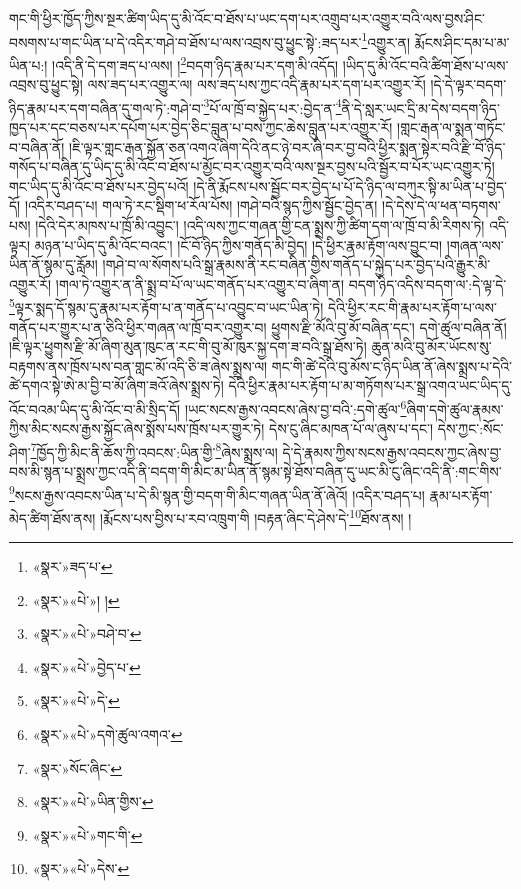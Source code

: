 གང་གི་ཕྱིར་ཁྱོད་ཀྱིས་སྔར་ཚིག་ཡིད་དུ་མི་འོང་བ་ཐོས་པ་ཡང་དག་པར་འགྲུབ་པར་འགྱུར་བའི་ལས་བྱས་ཤིང་བསགས་པ་གང་ཡིན་པ་དེ་འདིར་གཤེ་བ་ཐོས་པ་ལས་འབྲས་བུ་ཕྱུང་སྟེ་:ཟད་པར་\footnote{«སྣར་»ཟད་པ་}འགྱུར་ན། རྨོངས་ཤིང་དམ་པ་མ་ཡིན་པ:། །འདི་ནི་དེ་དག་ཟད་པ་ལས། །\footnote{«སྣར་»«པེ་»། །}བདག་ཉིད་རྣམ་པར་དག་མི་འདོད། །ཡིད་དུ་མི་འོང་བའི་ཚིག་ཐོས་པ་ལས་འབྲས་བུ་ཕྱུང་སྟེ། ལས་ཟད་པར་འགྱུར་ལ། ལས་ཟད་པས་ཀྱང་འདི་རྣམ་པར་དག་པར་འགྱུར་རོ། །དེ་དེ་ལྟར་བདག་ཉིད་རྣམ་པར་དག་བཞིན་དུ་གལ་ཏེ་:གཤེ་བ་\footnote{«སྣར་»«པེ་»བཤེ་བ་}པོ་ལ་ཁྲོ་བ་སྐྱེད་པར་:བྱེད་ན་\footnote{«སྣར་»«པེ་»བྱེད་པ་}ནི་དེ་སླར་ཡང་དྲི་མ་དེས་བདག་ཉིད་ཁྱད་པར་དང་བཅས་པར་དཔོག་པར་བྱེད་ཅིང་བླུན་པ་བས་ཀྱང་ཆེས་བླུན་པར་འགྱུར་རོ། །གླང་རྒན་ལ་སྨན་གཏོང་བ་བཞིན་ནོ། །ཇི་ལྟར་གླང་རྒན་སྐྱོན་ཅན་འགའ་ཞིག་དེའི་ནང་ཉེ་བར་ཞི་བར་བྱ་བའི་ཕྱིར་སྨན་སྟེར་བའི་རྫི་བོ་ཉིད་གསོད་པ་བཞིན་དུ་ཡིད་དུ་མི་འོང་བ་ཐོས་པ་མྱོང་བར་འགྱུར་བའི་ལས་སྔར་བྱས་པའི་སྦྱོར་བ་པོར་ཡང་འགྱུར་ཏེ། གང་ཡིད་དུ་མི་འོང་བ་ཐོས་པར་བྱེད་པའོ། །དེ་ནི་རྨོངས་པས་སྦྱོང་བར་བྱེད་པ་པོ་དེ་ཉིད་ལ་བཀུར་སྟི་མ་ཡིན་པ་བྱེད་དོ། །འདིར་བཤད་པ། གལ་ཏེ་རང་སྡིག་ཕ་རོལ་པོས། །གཤེ་བའི་སྙད་ཀྱིས་སྦྱོང་བྱེད་ན། །དེ་དེས་དེ་ལ་ཕན་བཏགས་པས། །དེའི་དེར་མཁས་པ་ཁྲོ་མི་འབྱུང་། །འདི་ལས་ཀྱང་གཞན་གྱི་ངན་སྨྲས་ཀྱི་ཚིག་དག་ལ་ཁྲོ་བ་མི་རིགས་ཏེ། འདི་ལྟར། མཉན་པ་ཡིད་དུ་མི་འོང་བའང་། །ངོ་བོ་ཉིད་ཀྱིས་གནོད་མི་བྱེད། །དེ་ཕྱིར་རྣམ་རྟོག་ལས་བྱུང་བ། །གཞན་ལས་ཡིན་ནོ་སྙམ་དུ་རློམ། །གཤེ་བ་ལ་སོགས་པའི་སྒྲ་རྣམས་ནི་རང་བཞིན་གྱིས་གནོད་པ་སྐྱེད་པར་བྱེད་པའི་རྒྱུར་མི་འགྱུར་རོ། །གལ་ཏེ་འགྱུར་ན་ནི་སྨྲ་བ་པོ་ལ་ཡང་གནོད་པར་འགྱུར་བ་ཞིག་ན། བདག་ཉིད་འདིས་བདག་ལ་:དེ་ལྟ་དེ་\footnote{«སྣར་»«པེ་»དེ་}ལྟར་སྨད་དོ་སྙམ་དུ་རྣམ་པར་རྟོག་པ་ན་གནོད་པ་འབྱུང་བ་ཡང་ཡིན་ཏེ། དེའི་ཕྱིར་རང་གི་རྣམ་པར་རྟོག་པ་ལས་གནོད་པར་གྱུར་པ་ན་ཅིའི་ཕྱིར་གཞན་ལ་ཁྲོ་བར་འགྱུར་བ། ཕྱུགས་རྫི་མོའི་བུ་མོ་བཞིན་དང་། དགེ་ཚུལ་བཞིན་ནོ། །ཇི་ལྟར་ཕྱུགས་རྫི་མོ་ཞིག་མུན་ཁུང་ན་རང་གི་བུ་མོ་ཁུར་སྐྱ་དག་ཟ་བའི་སྒྲ་ཐོས་ཏེ། ཆུན་མའི་བུ་མོར་ཡོངས་སུ་བརྟགས་ནས་ཁྲོས་པས་བན་གླང་མོ་འདི་ཅི་ཟ་ཞེས་སྨྲས་ལ། གང་གི་ཚེ་དེའི་བུ་མོས་ང་ཉིད་ཡིན་ནོ་ཞེས་སྨྲས་པ་དེའི་ཚེ་དགའ་སྟེ་ཨེ་མ་བྱི་བ་མོ་ཞིག་ཟའོ་ཞེས་སྨྲས་ཏེ། དེའི་ཕྱིར་རྣམ་པར་རྟོག་པ་མ་གཏོགས་པར་སྒྲ་འགའ་ཡང་ཡིད་དུ་འོང་བའམ་ཡིད་དུ་མི་འོང་བ་མི་སྲིད་དོ། །ཡང་སངས་རྒྱས་འབངས་ཞེས་བྱ་བའི་:དགེ་ཚུལ་\footnote{«སྣར་»«པེ་»དགེ་ཚུལ་འགའ་}ཞིག་དགེ་ཚུལ་རྣམས་ཀྱིས་མིང་སངས་རྒྱས་སྐྱོང་ཞེས་སྨོས་པས་ཁྲོས་པར་གྱུར་ཏེ། དེས་ངུ་ཞིང་མཁན་པོ་ལ་ཞུས་པ་དང་། དེས་ཀྱང་:སོང་ཤིག་\footnote{«སྣར་»སོང་ཞིང་}ཁྱོད་ཀྱི་མིང་ནི་ཆོས་ཀྱི་འབངས་:ཡིན་གྱི་\footnote{«སྣར་»«པེ་»ཡིན་གྱིས་}ཞེས་སྨྲས་ལ། དེ་དེ་རྣམས་ཀྱིས་སངས་རྒྱས་འབངས་ཀྱང་ཞེས་བྱ་བས་མི་སྙན་པ་སྨྲས་ཀྱང་འདི་ནི་བདག་གི་མིང་མ་ཡིན་ནོ་སྙམ་སྟེ་ཐོས་བཞིན་དུ་ཡང་མི་ངུ་ཞིང་འདི་ནི་:གང་གིས་\footnote{«སྣར་»«པེ་»གང་གི་}སངས་རྒྱས་འབངས་ཡིན་པ་དེ་མི་སྙན་གྱི་བདག་གི་མིང་གཞན་ཡིན་ནོ་ཞེའོ། །འདིར་བཤད་པ། རྣམ་པར་རྟོག་མེད་ཚིག་ཐོས་ནས། །རྨོངས་པས་བྱིས་པ་རབ་འཁྲུག་གི །བརྟན་ཞིང་དེ་ཤེས་དེ་\footnote{«སྣར་»«པེ་»དེས་}ཐོས་ནས། །
